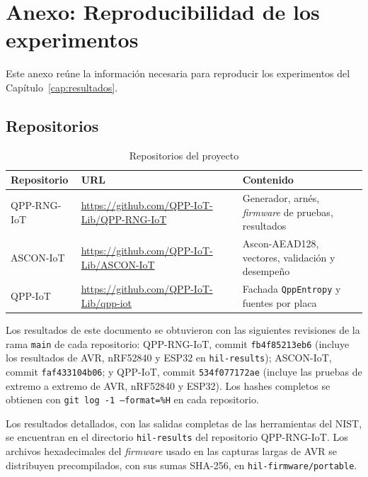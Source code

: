 \chapter{Anexo: Reproducibilidad de los experimentos}
\label{anexo:reproducibilidad}

Este anexo reúne la información necesaria para reproducir los experimentos del Capítulo~\ref{cap:resultados}.

\section{Repositorios}

\begin{table}[H]
\centering
\caption{Repositorios del proyecto}
\label{tab:repositorios}
\begin{tabularx}{\textwidth}{@{}L{0.20\textwidth}L{0.42\textwidth}Y@{}}
\toprule
\textbf{Repositorio} & \textbf{URL} & \textbf{Contenido} \\
\midrule
QPP-RNG-IoT & \url{https://github.com/QPP-IoT-Lib/QPP-RNG-IoT} & Generador, arnés, \textit{firmware} de pruebas, resultados \\
ASCON-IoT & \url{https://github.com/QPP-IoT-Lib/ASCON-IoT} & Ascon-AEAD128, vectores, validación y desempeño \\
QPP-IoT & \url{https://github.com/QPP-IoT-Lib/qpp-iot} & Fachada \texttt{QppEntropy} y fuentes por placa \\
\bottomrule
\end{tabularx}
\end{table}
Los resultados de este documento se obtuvieron con las siguientes revisiones de la rama \texttt{main} de cada repositorio: QPP-RNG-IoT, commit \texttt{fb4f85213eb6} (incluye los resultados de AVR, nRF52840 y ESP32 en \texttt{hil-results}); ASCON-IoT, commit \texttt{faf433104b06}; y QPP-IoT, commit \texttt{534f077172ae} (incluye las pruebas de extremo a extremo de AVR, nRF52840 y ESP32). Los hashes completos se obtienen con \texttt{git log -1 --format=\%H} en cada repositorio.

Los resultados detallados, con las salidas completas de las herramientas del NIST, se encuentran en el directorio \texttt{hil-results} del repositorio QPP-RNG-IoT. Los archivos hexadecimales del \textit{firmware} usado en las capturas largas de AVR se distribuyen precompilados, con sus sumas SHA-256, en \texttt{hil-firmware/portable}.

